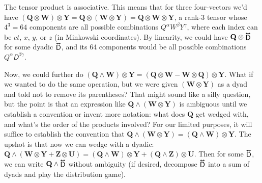\documentclass[12pt]{article}
\renewcommand{\vv}[1]{\mathbf{#1}}
\newcommand{\tightoverset}[2]{%
  \mathop{#2}\limits^{\vbox to -.5ex{\kern-0.75ex\hbox{$#1$}\vss}}}
\newcommand{\inlinedy}[1]{\tightoverset{\text{\tiny$\bm\leftrightarrow$}}{#1}}
\begin{document}
The tensor product is associative. This means that for three four-vectors we'd have $(\vv Q \otimes \vv W) \otimes \vv Y = \vv Q \otimes (\vv W \otimes \vv Y) = \vv Q \otimes \vv W \otimes \vv Y$, a rank-3 tensor whose $4^3 = 64$ components are all possible combinations $Q^\alpha W^\beta Y^\gamma$, where each index can be $ct$, $x$, $y$, or $z$ (in Minkowski coordinates). By linearity, we could have $\vv Q \otimes \inlinedy{\mathsf{D}}$ for some dyadic $\inlinedy{\mathsf{D}}$, and its 64 components would be all possible combinations  $Q^\alpha \mathsfit D^{\beta \gamma}$.

Now, we could further do $(\vv Q \wedge \vv W) \otimes \vv Y = (\vv Q \otimes \vv W - \vv W \otimes \vv Q) \otimes \vv Y$. What if we wanted to do the same operation, but we were given $(\vv W \otimes \vv Y)$ as a dyad and told not to remove its parentheses? That might sound like a silly question, but the point is that an expression like $\vv Q \wedge (\vv W \otimes \vv Y)$ is ambiguous until we establish a convention or invent more notation: what does $\vv Q$ get wedged with, and what's the order of the products involved? For our limited purposes, it will suffice to establish the convention that ${\vv Q \wedge (\vv W \otimes \vv Y) = (\vv Q \wedge \vv W) \otimes \vv Y}$. The upshot is that now we can wedge with a dyadic: $\vv Q \wedge (\vv W \otimes \vv Y + \vv Z \otimes \vv U) = (\vv Q \wedge \vv W) \otimes \vv Y + (\vv Q \wedge \vv Z) \otimes \vv U$. Then for some $\inlinedy{\mathsf{D}}$, we can write $\vv Q \wedge \inlinedy{\mathsf{D}}$ without ambiguity (if desired, decompose $\inlinedy{\mathsf{D}}$ into a sum of dyads and play the distribution game).
\end{document}

